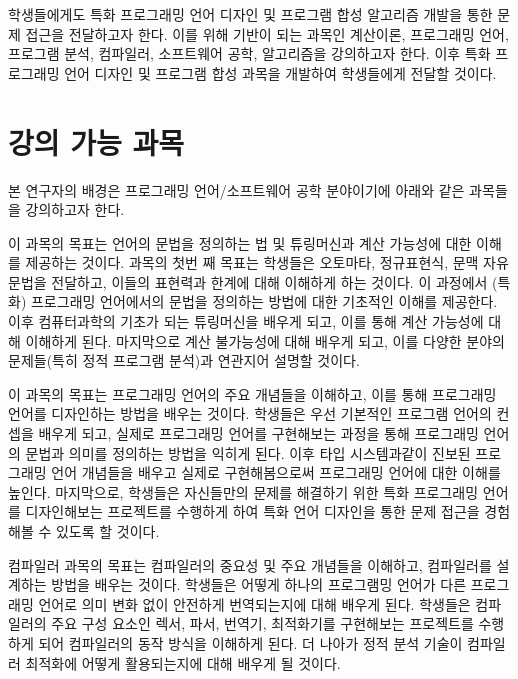 \documentclass[11pt]{article}
\newcommand{\myparagraph}[1]{\medskip\noindent{\it \textbf{#1.}}}
\begin{document}
\begin{spacing}{1.145}
학생들에게도 특화 프로그래밍 언어 디자인 및 프로그램 합성 알고리즘 개발을 통한 문제 접근을 전달하고자 한다.
%
이를 위해 기반이 되는 과목인 계산이론, 프로그래밍 언어, 프로그램 분석, 컴파일러, 소프트웨어 공학, 알고리즘을 강의하고자 한다.
%
이후 특화 프로그래밍 언어 디자인 및 프로그램 합성 과목을 개발하여 학생들에게 전달할 것이다.



\section{강의 가능 과목}
본 연구자의 배경은 프로그래밍 언어/소프트웨어 공학 분야이기에 아래와 같은 과목들을 강의하고자 한다.



\myparagraph{계산이론} 
%
이 과목의 목표는 언어의 문법을 정의하는 법 및 튜링머신과 계산 가능성에 대한 이해를 제공하는 것이다. 
%
과목의 첫번 째 목표는 학생들은 오토마타, 정규표현식, 문맥 자유 문법을 전달하고, 이들의 표현력과 한계에 대해 이해하게 하는 것이다.
%
이 과정에서 (특화) 프로그래밍 언어에서의 문법을 정의하는 방법에 대한 기초적인 이해를 제공한다.
%
이후 컴퓨터과학의 기초가 되는 튜링머신을 배우게 되고, 이를 통해 계산 가능성에 대해 이해하게 된다.
%
마지막으로 계산 불가능성에 대해 배우게 되고, 이를 다양한 분야의 문제들(특히 정적 프로그램 분석)과 연관지어 설명할 것이다.



\myparagraph{프로그래밍 언어}
%
이 과목의 목표는 프로그래밍 언어의 주요 개념들을 이해하고, 이를 통해 프로그래밍 언어를 디자인하는 방법을 배우는 것이다.
%
학생들은 우선 기본적인 프로그램 언어의 컨셉을 배우게 되고, 실제로 프로그래밍 언어를 구현해보는 과정을 통해 프로그래밍 언어의 문법과 의미를 정의하는 방법을 익히게 된다.
%
이후 타입 시스템과같이 진보된 프로그래밍 언어 개념들을 배우고 실제로 구현해봄으로써 프로그래밍 언어에 대한 이해를 높인다.
%
마지막으로, 학생들은 자신들만의 문제를 해결하기 위한 특화 프로그래밍 언어를 디자인해보는 프로젝트를 수행하게 하여 특화 언어 디자인을 통한 문제 접근을 경험해볼 수 있도록 할 것이다.






\myparagraph{컴파일러}
%
컴파일러 과목의 목표는 컴파일러의 중요성 및 주요 개념들을 이해하고, 컴파일러를 설계하는 방법을 배우는 것이다.
%
학생들은 어떻게 하나의 프로그램밍 언어가 다른 프로그래밍 언어로 의미 변화 없이 안전하게 번역되는지에 대해 배우게 된다.
%
학생들은 컴파일러의 주요 구성 요소인 렉서, 파서, 번역기, 최적화기를 구현해보는 프로젝트를 수행하게 되어 컴파일러의 동작 방식을 이해하게 된다.
%
더 나아가 정적 분석 기술이 컴파일러 최적화에 어떻게 활용되는지에 대해 배우게 될 것이다.




\end{spacing}
\end{document}
